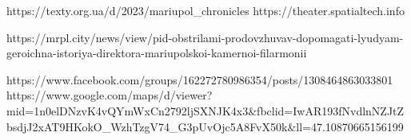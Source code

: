  
 
 
 
 


https://texty.org.ua/d/2023/mariupol_chronicles
https://theater.spatialtech.info

https://mrpl.city/news/view/pid-obstrilami-prodovzhuvav-dopomagati-lyudyam-geroichna-istoriya-direktora-mariupolskoi-kamernoi-filarmonii

https://www.facebook.com/groups/162272780986354/posts/1308464863033801
https://www.google.com/maps/d/viewer?mid=1n0elDNzvK4vQYmWxCn2792ljSXNJK4x3&fbclid=IwAR193fNvdlnNZJtZbsdjJ2xAT9HKokO_WzhTzgV74_G3pUvOjc5A8FvX50k&ll=47.10870665156199%
